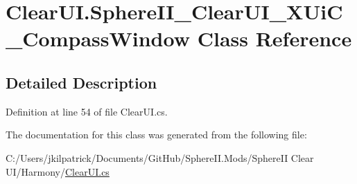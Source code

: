 \hypertarget{class_clear_u_i_1_1_sphere_i_i___clear_u_i___x_ui_c___compass_window}{}\section{Clear\+U\+I.\+Sphere\+I\+I\+\_\+\+Clear\+U\+I\+\_\+\+X\+Ui\+C\+\_\+\+Compass\+Window Class Reference}
\label{class_clear_u_i_1_1_sphere_i_i___clear_u_i___x_ui_c___compass_window}


\subsection{Detailed Description}


Definition at line 54 of file Clear\+U\+I.\+cs.



The documentation for this class was generated from the following file\+:\begin{DoxyCompactItemize}
\item 
C\+:/\+Users/jkilpatrick/\+Documents/\+Git\+Hub/\+Sphere\+I\+I.\+Mods/\+Sphere\+I\+I Clear U\+I/\+Harmony/\mbox{\hyperlink{_clear_u_i_8cs}{Clear\+U\+I.\+cs}}\end{DoxyCompactItemize}
